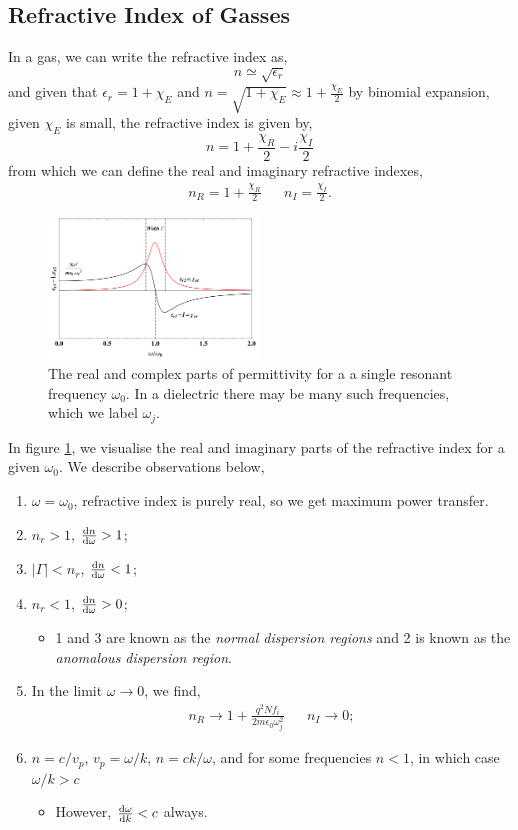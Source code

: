 \documentclass{book}
\begin{document}
\subsection{Refractive Index of Gasses}
In a gas, we can write the refractive index as,
\begin{equation}
	n \simeq \sqrt{\epsilon_r}
\end{equation}
and given that $\epsilon_r = 1 + \chi_E$ and $n = \sqrt{1 + \chi_E} \approx 1 + \frac{\chi_E}{2}$ by binomial expansion, given $\chi_E$ is small, the refractive index is given by,
\begin{equation}
	n = 1 + \frac{\chi_{R}}{2} - i \frac{\chi_{I}}{2}
\end{equation}
from which we can define the real and imaginary refractive indexes,
\begin{align}
	n_R = 1 + \frac{\chi_{R}}{2} && n_I = \frac{\chi_{I}}{2}.
\end{align}
\begin{figure}
	\centering
	\includegraphics[width=0.5\textwidth]{realimg.png}
	\caption{The real and complex parts of permittivity for a a single resonant frequency $\omega_0$. In a dielectric there may be many such frequencies, which we label $\omega_j$.}
	\label{fig:gasses}
\end{figure}
In figure \ref{fig:gasses}, we visualise the real and imaginary parts of the refractive index for a given $\omega_0$. We describe observations below,
\begin{enumerate}
	\item $\omega = \omega_0$, refractive index is purely real, so we get maximum power transfer.
	\item $n_r > 1$, $\dv{n}{\omega} > 1$;
	\item $|\Gamma| < n_r$, $\dv{n}{\omega} < 1$;
	\item $n_r < 1$, $\dv{n}{\omega} > 0$;
	\begin{itemize}
		\item 1 and 3 are known as the \textit{normal dispersion regions} and 2 is known as the \textit{anomalous dispersion region}. 
	\end{itemize}
	
	\item In the limit $\omega \to 0$, we find,
	\begin{align}
		n_R \to 1 + \frac{q^2Nf_i}{2m\epsilon_0\omega_j^2} && n_I \to 0;
	\end{align}
	\item $n = c/v_p$, $v_p = \omega/k$, $n = ck/\omega$, and for some frequencies $n < 1$, in which case $\omega/k > c$
	\begin{itemize}
		\item However, $\dv{\omega}{k} < c$ always. 
	\end{itemize}
\end{enumerate}
\end{document}
